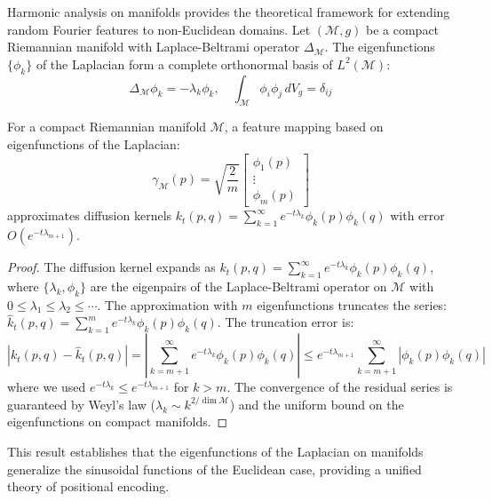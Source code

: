 Harmonic analysis on manifolds provides the theoretical framework for extending random Fourier features to non-Euclidean domains. Let $(\mathcal{M}, g)$ be a compact Riemannian manifold with Laplace-Beltrami operator $\Delta_{\mathcal{M}}$. The eigenfunctions $\{\phi_k\}$ of the Laplacian form a complete orthonormal basis of $L^2(\mathcal{M})$:
\begin{equation}
\Delta_{\mathcal{M}} \phi_k = -\lambda_k \phi_k, \quad \int_{\mathcal{M}} \phi_i \phi_j \, dV_g = \delta_{ij}
\end{equation}

\begin{proposition}
For a compact Riemannian manifold $\mathcal{M}$, a feature mapping based on eigenfunctions of the Laplacian:
\begin{equation}
\gamma_{\mathcal{M}}(p) = \sqrt{\frac{2}{m}} \begin{bmatrix} \phi_1(p) \\ \vdots \\ \phi_m(p) \end{bmatrix}
\end{equation}
approximates diffusion kernels $k_t(p, q) = \sum_{k=1}^\infty e^{-t\lambda_k} \phi_k(p)\phi_k(q)$ with error $O(e^{-t\lambda_{m+1}})$.
\end{proposition}

\begin{proof}
The diffusion kernel expands as $k_t(p,q) = \sum_{k=1}^{\infty} e^{-t\lambda_k} \phi_k(p) \phi_k(q)$, where $\{\lambda_k, \phi_k\}$ are the eigenpairs of the Laplace-Beltrami operator on $\mathcal{M}$ with $0 \leq \lambda_1 \leq \lambda_2 \leq \cdots$. The approximation with $m$ eigenfunctions truncates the series: $\hat{k}_t(p,q) = \sum_{k=1}^{m} e^{-t\lambda_k} \phi_k(p) \phi_k(q)$. The truncation error is:
\[
|k_t(p,q) - \hat{k}_t(p,q)| = \left|\sum_{k=m+1}^{\infty} e^{-t\lambda_k} \phi_k(p) \phi_k(q)\right| \leq e^{-t\lambda_{m+1}} \sum_{k=m+1}^{\infty} |\phi_k(p) \phi_k(q)|
\]
where we used $e^{-t\lambda_k} \leq e^{-t\lambda_{m+1}}$ for $k > m$. The convergence of the residual series is guaranteed by Weyl's law ($\lambda_k \sim k^{2/\dim \mathcal{M}}$) and the uniform bound on the eigenfunctions on compact manifolds.
\end{proof}

This result establishes that the eigenfunctions of the Laplacian on manifolds generalize the sinusoidal functions of the Euclidean case, providing a unified theory of positional encoding.

